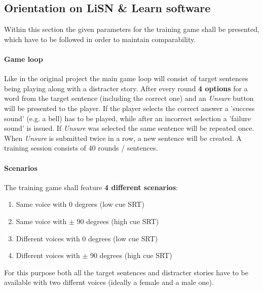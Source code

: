 \documentclass[a4paper,11pt]{article}%
\renewcommand{\\}{\vspace*{0.5\baselineskip} \newline}
\begin{document}



\subsection{Orientation on LiSN \& Learn software}
Within this section the given parameters for the training game shall be presented, which have to be followed in order to maintain comparability.


\paragraph{Game loop} Like in the original project the main game loop will consist of target sentences being playing along with a distracter story. After every round \textbf{4 options} for a word from the target sentence (including the correct one) and an \textit{Unsure} button will be presented to the player. If the player selects the correct answer a 'success sound' (e.g. a bell) has to be played, while after an incorrect selection a 'failure sound' is issued. If \textit{Unsure} was selected the same sentence will be repeated once. When \textit{Unsure} is submitted twice in a row, a new sentence will be created. A training session consists of 40 rounds / sentences.

\paragraph{Scenarios} The training game shall feature \textbf{4 different scenarios}:
\begin{enumerate}
\item Same voice with 0 degrees (low cue \ac{SRT})
\item Same voice with $\pm$ 90 degrees (high cue \ac{SRT})
\item Different voices with 0 degrees (low cue \ac{SRT})
\item Different voices with $\pm$ 90 degrees (high cue \ac{SRT})
\end{enumerate}
For this purpose both all the target sentences and distracter stories have to be available with two differnt voices (ideally a female and a male one).
\end{document}
